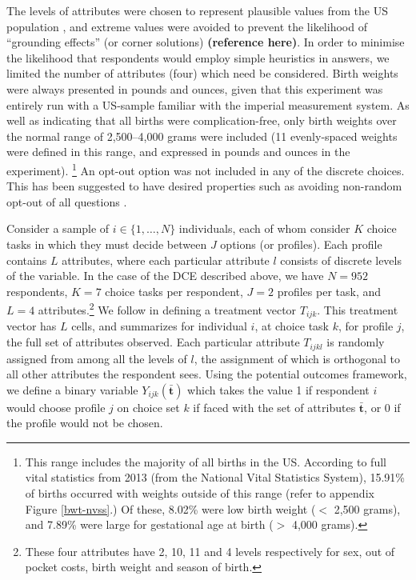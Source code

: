 \documentclass[a4paper, 11pt]{article}
\begin{document}
\begin{spacing}{1.4}
The levels of attributes were chosen to represent plausible values from the
US population \citep{RyanFarrar2000}, and extreme values were avoided to
prevent the likelihood of ``grounding effects'' (or corner solutions)
\textbf{(reference here)}.  In
order to minimise the likelihood that respondents would employ simple
heuristics in answers, we limited the number of attributes (four) which need be
considered.  Birth weights were always presented in pounds and ounces, given
that this experiment was entirely run with a US-sample familiar with the
imperial measurement system.  As well as indicating
that all births were complication-free, only birth weights over the normal
range of 2,500--4,000 grams were included (11 evenly-spaced weights were
defined in this range, and expressed in pounds and ounces in the experiment).%
\footnote{This range includes the majority of all births in the US.  According
  to full vital statistics from
  2013 (from the National Vital Statistics System), 15.91\% of births occurred
  with weights outside of this range (refer to appendix Figure \ref{bwt-nvss}.)
  Of these, 8.02\% were low birth weight ($<$ 2,500 grams), and 7.89\% were
  large for gestational age at birth ($>$ 4,000 grams).
}
An opt-out option was not included in any of the discrete choices.  This
has been suggested to have desired properties such as avoiding non-random
opt-out of all questions \citep{Veldwijketal2014,BekkerGrobetal2012}.

Consider a sample of $i\in \{1,\ldots,N\}$ individuals, each of whom consider
$K$ choice tasks in which they must decide between $J$ options (or profiles).
Each profile contains $L$ attributes, where each particular attribute $l$
consists of discrete levels of the variable.  In the case of the DCE
described above, we have $N=952$ respondents, $K=7$ choice tasks per
respondent, $J=2$ profiles per task, and $L=4$ attributes.\footnote{These
  four attributes have 2, 10, 11 and 4 levels respectively for sex, out of pocket
  costs, birth weight and season of birth.} We follow
\citet{Hainmuelleretal2013} in defining a treatment vector $T_{ijk}$.
This treatment vector has $L$ cells, and summarizes for individual $i$,
at choice task $k$, for profile $j$, the full set of attributes observed.
Each particular attribute $T_{ijkl}$ is randomly assigned from among all
the levels of $l$, the assignment of which is orthogonal to all other
attributes the respondent sees.  Using the potential outcomes framework,
we define a binary variable $Y_{ijk}(\bar{\mathbf{t}})$ which takes the
value 1 if respondent $i$ would choose profile $j$ on choice set $k$ if
faced with the set of attributes $\bar{\mathbf{t}}$, or 0 if the profile
would not be chosen.


\end{spacing}
\end{document}
